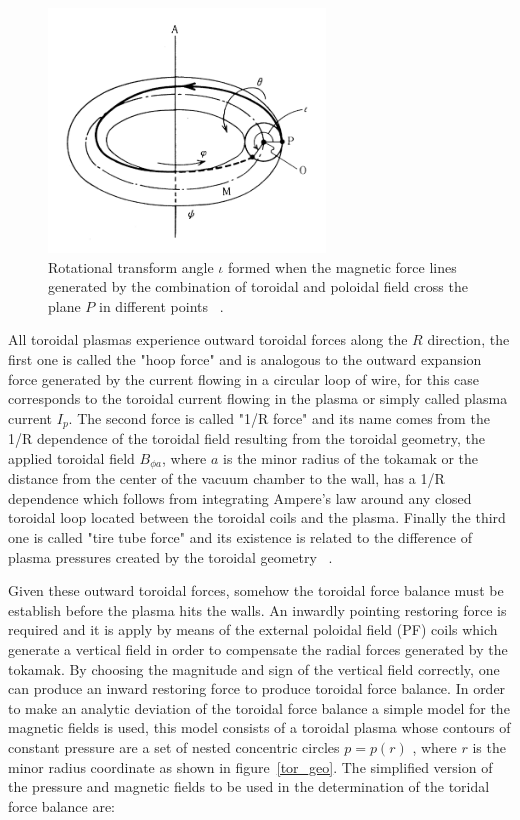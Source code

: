 \begin{figure}
	\centering
	\includegraphics[width=0.655\textwidth]{Chp1/rotational_angle.png}
	\caption{Rotational transform angle $\iota$ formed when the magnetic force lines generated by the combination of toroidal and poloidal field cross the plane $P$ in different points  ~\cite[Chapter~3]{Miyamoto2011}. \label{rot_angle}}
\end{figure}

 All toroidal plasmas experience  outward toroidal forces along the $R$ direction, the first one is called the "hoop force" and is analogous to  the outward expansion force generated by the current flowing in a circular loop of wire, for this case corresponds to the toroidal current flowing in the plasma or simply called plasma current $I_p$. The second force is called "1/R force" and its name comes from the 1/R dependence of the toroidal field resulting from the toroidal geometry, the applied toroidal field $B_{\phi a}$,  where $a$ is the minor radius of the tokamak or the distance from the center of the vacuum chamber to the wall, has a 1/R dependence which follows from integrating Ampere's law around any closed toroidal loop located between the toroidal coils and the plasma. Finally the third one is called "tire tube force" and its existence is related to the difference of plasma pressures created by the toroidal geometry ~\cite[Chapter~11]{Freidberg2007}. \smallskip 
 
Given these outward toroidal forces, somehow the  toroidal force balance must be establish before the plasma hits the walls. An inwardly pointing restoring force is required and it is apply by means of the external poloidal field (PF) coils which generate a vertical field in order to compensate the radial forces generated by the tokamak.  By choosing the magnitude and sign of the vertical field correctly, one can produce an inward restoring force to produce toroidal force balance. In order to make an analytic deviation of the toroidal force balance a simple model for the magnetic fields is used, this model consists of a toroidal plasma whose contours of constant pressure are a set of nested concentric circles $p=p(r)$ , where $r$ is the minor radius coordinate as shown in figure~\ref{tor_geo}. The simplified version of the pressure and magnetic fields to be used in the determination of the toridal force balance are:

